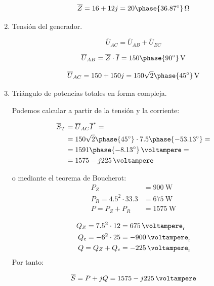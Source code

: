 \documentclass[12pt]{article}
\begin{document}
\begin{enumerate}
  \[
    \overline{Z} = 16 + 12j  = \SI[parse-numbers=false]{20\phase{\ang{36.87}}}{\ohm}
  \]

  
\item Tensión del generador.

  \[
    \overline{U}_{AC} = \overline{U}_{AB} + \overline{U}_{BC}
  \]

  \[
    \overline{U}_{AB} = \overline{Z} \cdot \overline{I} = \SI[parse-numbers=false]{150\phase{\ang{90}}}{\volt}
  \]

  \[
    \overline{U}_{AC} = 150 + 150j = \SI[parse-numbers=false]{150\sqrt{2}\phase{\ang{45}}}{\volt}
  \]

\item Triángulo de potencias totales en forma compleja.

  Podemos calcular a partir de la tensión y la corriente:


  \begin{align*}
    \overline{S}_T &= \overline{U}_{AC} \overline{I}^* =\\
                   &= 150\sqrt{2}\phase{\ang{45}} \cdot 7.5\phase{\ang{-53.13}} =\\
                   &= \SI[parse-numbers=false]{1591\phase{\ang{-8.13}}}{\voltampere}=\\
                   &= \SI[parse-numbers=false]{1575 - j225}{\voltampere}
  \end{align*}
  
  o mediante el teorema de Boucherot:
  \begin{align*}
    P_Z &= \SI{900}{\watt}\\
    P_R = 4.5^2 \cdot 33.3 &= \SI{675}{\watt}\\
    P = P_Z + P_R &= \SI{1575}{\watt}
  \end{align*}

  \begin{align*}
    Q_Z = 7.5^2 \cdot 12 &= \SI{675}{\voltampere_r}\\
    Q_c = - 6^2 \cdot 25 &= \SI{-900}{\voltampere_r}\\
    Q = Q_Z + Q_c &= \SI{-225}{\voltampere_r}
  \end{align*}
  Por tanto:

  \[
    \overline{S} = P + jQ = \SI[parse-numbers=false]{1575 - j225}{\voltampere}
  \]
  
\end{enumerate}


\clearpage

\section{}
\end{document}
